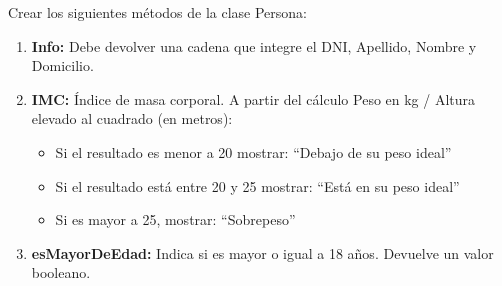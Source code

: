 
Crear los siguientes m\'etodos de la clase Persona:

\begin{enumerate}[label=\alph*), itemsep=0.5em]
    \item \textbf{Info:} Debe devolver una cadena que integre el DNI, Apellido, Nombre y Domicilio.
    
    \item \textbf{IMC:} \'Indice de masa corporal. A partir del c\'alculo Peso en kg / Altura elevado al cuadrado (en metros):
    \begin{itemize}[itemsep=0.2em]
        \item Si el resultado es menor a 20 mostrar: ``Debajo de su peso ideal''
        \item Si el resultado est\'a entre 20 y 25 mostrar: ``Est\'a en su peso ideal''
        \item Si es mayor a 25, mostrar: ``Sobrepeso''
    \end{itemize}
    
    \item \textbf{esMayorDeEdad:} Indica si es mayor o igual a 18 años. Devuelve un valor booleano.
\end{enumerate}


\volverindice
\newpage